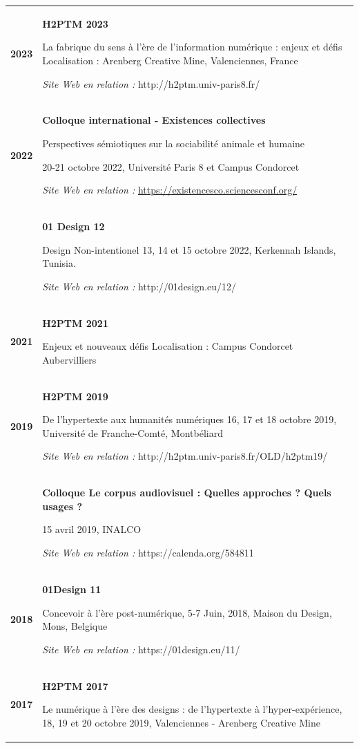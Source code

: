 \documentclass[
  a4paper,
  DIV=11,
  numbers=noendperiod]{scrreprt}
\begin{document}
\begin{longtable}[]{@{}
  >{\raggedright\arraybackslash}p{}
  >{\raggedright\arraybackslash}p{}@{}}
\toprule\noalign{}
\endhead
\bottomrule\noalign{}
\endlastfoot
\textbf{2023} & \textbf{H2PTM 2023}

La fabrique du sens à l'ère de l'information numérique : enjeux et défis
Localisation : Arenberg Creative Mine, Valenciennes, France

\emph{Site Web en relation :} http://h2ptm.univ-paris8.fr/ \\
\textbf{2022} & \textbf{Colloque international - Existences collectives}

Perspectives sémiotiques sur la sociabilité animale et humaine

20-21 octobre 2022, Université Paris 8 et Campus Condorcet

\emph{Site Web en relation :}
\url{https://existencesco.sciencesconf.org/} \\
& \textbf{01 Design 12}

Design Non-intentionel 13, 14 et 15 octobre 2022, Kerkennah Islands,
Tunisia.

\emph{Site Web en relation :} http://01design.eu/12/ \\
\textbf{2021} & \textbf{H2PTM 2021}

Enjeux et nouveaux défis Localisation : Campus Condorcet
Aubervilliers \\
\textbf{2019} & \textbf{H2PTM 2019}

De l'hypertexte aux humanités numériques 16, 17 et 18 octobre 2019,
Université de Franche-Comté, Montbéliard

\emph{Site Web en relation :}
http://h2ptm.univ-paris8.fr/OLD/h2ptm19/ \\
& \textbf{Colloque Le corpus audiovisuel : Quelles approches ? Quels
usages ?}

15 avril 2019, INALCO

\emph{Site Web en relation :} https://calenda.org/584811 \\
\textbf{2018} & \textbf{01Design 11}

Concevoir à l'ère post-numérique, 5-7 Juin, 2018, Maison du Design,
Mons, Belgique

\emph{Site Web en relation :} https://01design.eu/11/ \\
\textbf{2017} & \textbf{H2PTM 2017}

Le numérique à l'ère des designs : de l'hypertexte à l'hyper-expérience,
18, 19 et 20 octobre 2019, Valenciennes - Arenberg Creative Mine


\end{longtable}
\end{document}
